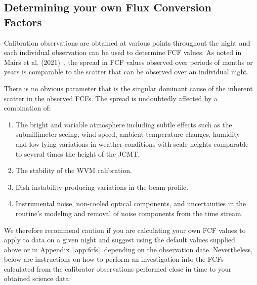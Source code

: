 \subsection{Determining your own Flux Conversion Factors}
\label{sec:own_fcf}

Calibration observations are obtained at various points throughout the
night and each individual observation can be used to determine FCF values.
As noted in Mairs et al. (2021)~\cite{mairs21}, the spread in FCF values observed 
over periods of months or years is comparable to the scatter that can be observed
over an individual night.  

There is no obvious parameter that is the singular dominant cause of the inherent scatter 
in the observed FCFs. The spread is undoubtedly affected by a combination of:

\begin{enumerate}

\item The bright and variable atmosphere including subtle effects such as the 
submillimeter seeing, wind speed, ambient-temperature changes, humidity and low-lying variations 
in weather conditions with scale heights comparable to several times the height of the JCMT.

\item The stability of the WVM calibration. 

\item Dish instability producing variations in the beam profile.

\item Instrumental noise, non-cooled optical components, and uncertainties in the {} routine's 
modeling and removal of noise components from the time stream.

\end{enumerate}

We therefore recommend caution if you are calculating your own FCF 
values to apply to data on a given night and suggest using the default values
supplied above or in Appendix~\ref{app:fcfs}, depending on the observation date. 
Nevertheless, below are instructions on how to perform an investigation into 
the FCFs calculated from the calibrator observations performed close in time 
to your obtained science data:

